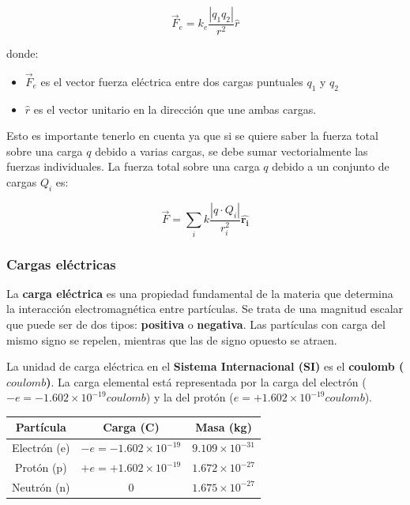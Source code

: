 \begin{equation}
    \vec{F}_e = k_e \frac{|q_1 q_2|}{r^2} \hat{r}
    \label{eq:ley_coulomb_vectorial}
\end{equation}

donde:
\begin{itemize}
    \item \( \vec{F}_e \) es el vector fuerza eléctrica entre dos cargas puntuales \( q_1 \) y \( q_2 \)
    \item \( \hat{r} \) es el vector unitario en la dirección que une ambas cargas.
\end{itemize}

Esto es importante tenerlo en cuenta ya que si se quiere saber la fuerza total sobre una carga \( q \) debido a varias cargas, se debe sumar vectorialmente las fuerzas individuales. La fuerza total sobre una carga \( q \) debido a un conjunto de cargas \( Q_i \) es:

\begin{equation}
    \vec{F} = \sum_i k \frac{|q \cdot Q_i|}{r_i^2} \hat{\mathbf{r_i}}
    \label{eq:ley_coulomb_vectorial_suma}
\end{equation}

\subsubsection{Cargas eléctricas}

La \textbf{carga eléctrica} es una propiedad fundamental de la materia que determina la interacción electromagnética entre partículas. Se trata de una magnitud escalar que puede ser de dos tipos: \textbf{positiva} o \textbf{negativa}. Las partículas con carga del mismo signo se repelen, mientras que las de signo opuesto se atraen.

La unidad de carga eléctrica en el \textbf{Sistema Internacional (SI)} es el \textbf{coulomb (\( \si{coulomb} \))}. La carga elemental está representada por la carga del electrón (\( -e = -1.602 \times 10^{-19} \si{coulomb} \)) y la del protón (\( e = +1.602 \times 10^{-19} \si{coulomb} \)).

\begin{center}
    \setlength{\arrayrulewidth}{1pt}  %
    \renewcommand{\arraystretch}{1.3} %

    \begin{tabular}{ c c c }
        \hline
        \rowcolor{asparagus!30}
        \textbf{Partícula}  & \textbf{Carga (\si{C})}           & \textbf{Masa (\si{kg})}   \\ \hline
        Electrón (e)        & \(-e = -1.602 \times 10^{-19}\)   & \(9.109 \times 10^{-31}\) \\
        Protón (p)          & \(+e = +1.602 \times 10^{-19}\)   & \(1.672 \times 10^{-27}\) \\
        Neutrón (n)         & \(0\)                             & \(1.675 \times 10^{-27}\) \\ \hline
    \end{tabular}
\end{center}

